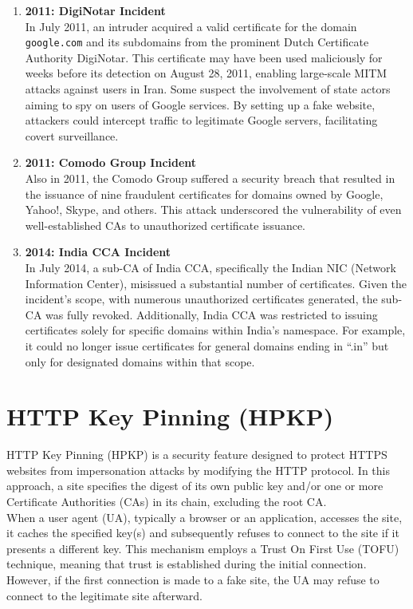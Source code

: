 \begin{enumerate}
  \item \textbf{2011: DigiNotar Incident} \\
    In July 2011, an intruder acquired a valid certificate for the domain \texttt{google.com} and its subdomains from the prominent Dutch Certificate Authority DigiNotar. This certificate may have been used maliciously for weeks before its detection on August 28, 2011, enabling large-scale MITM attacks against users in Iran. Some suspect the involvement of state actors aiming to spy on users of Google services. By setting up a fake website, attackers could intercept traffic to legitimate Google servers, facilitating covert surveillance.

  \item \textbf{2011: Comodo Group Incident} \\
    Also in 2011, the Comodo Group suffered a security breach that resulted in the issuance of nine fraudulent certificates for domains owned by Google, Yahoo!, Skype, and others. This attack underscored the vulnerability of even well-established CAs to unauthorized certificate issuance.

  \item \textbf{2014: India CCA Incident} \\
    In July 2014, a sub-CA of India CCA, specifically the Indian NIC (Network Information Center), misissued a substantial number of certificates. Given the incident's scope, with numerous unauthorized certificates generated, the sub-CA was fully revoked. Additionally, India CCA was restricted to issuing certificates solely for specific domains within India’s namespace. For example, it could no longer issue certificates for general domains ending in ``.in'' but only for designated domains within that scope.
\end{enumerate}

\section{HTTP Key Pinning (HPKP)}

HTTP Key Pinning (HPKP) is a security feature designed to protect
HTTPS websites from impersonation attacks by modifying the HTTP
protocol. In this approach, a site specifies the digest of its own
public key and/or one or more Certificate Authorities (CAs) in its
chain, excluding the root CA.\\
When a user agent (UA), typically a browser or an application,
accesses the site, it caches the specified key(s) and subsequently
refuses to connect to the site if it presents a different key. This
mechanism employs a Trust On First Use (TOFU) technique, meaning that
trust is established during the initial connection. However, if the
first connection is made to a fake site, the UA may refuse to connect
to the legitimate site afterward.

